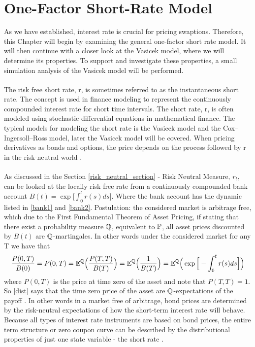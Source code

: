 \section{One-Factor Short-Rate Model}
As we have established, interest rate is crucial 
for pricing swaptions. Therefore, this Chapter will 
begin by examining the general one-factor short rate 
model. It will then continue with a closer look at the 
Vasicek model, where we will determine its properties. 
To support and investigate these properties, a small 
simulation analysis of the Vasicek model will be 
performed.
\\\\
The risk free short rate, r, is sometimes referred to as the instantaneous short rate. 
The concept is used in finance modeling to represent the continuously compounded interest rate for 
short time intervals. The short rate, r, is often modeled using stochastic differential equations in 
mathematical finance. The typical models for modeling the short rate is the Vasicek model and the Cox–Ingersoll–Ross model, 
later the Vasicek model will be covered. When pricing derivatives as bonds and options, the price depends on 
the process followed by r in the risk-neutral world \cite{Hull}.
\\\\
As discussed in the Section \ref{risk_neutral_section} - Risk Neutral Measure, $r_t$, can be looked at the locally risk free 
rate from a continuously compounded bank account $B(t)= \exp \Big[\int_{0}^{t} r(s) ds \Big]$. 
Where the bank account has the dynamic listed in \autoref{bank1} and \autoref{bank2}.
Postulation: the considered market is arbitrage free, which due to the First Fundamental Theorem of Asset Pricing, 
if stating that there exist a probability measure $\mathbb{Q}$, equivalent to $\mathbb{P}$, all asset prices discounted by $B(t)$
are $\mathbb{Q}$-martingales. In other words under the considered market for any T we have that 
\begin{align}
    \frac{P(0,T)}{B(0)} = P(0,T) = \mathbb{E}^{\mathbb{Q}} \Big( \frac{P(T,T)}{B(T)}\Big) = \mathbb{E}^{\mathbb{Q}} \Big( \frac{1}{B(T)}\Big) 
    = \mathbb{E}^{\mathbb{Q}} \Big( \exp \Big[ - \int_{0}^{t}r(s)ds \Big] \Big)
    \label{dist}
\end{align}
where $P(0,T)$ is the price at time zero of the asset and note that $P(T,T)=1$. So \autoref{dist} says that 
the time zero price of the asset are $\mathbb{Q}$-expectations  of the payoff \cite{Bermudan}.
In other words in a market free of arbitrage, bond prices are determined by the risk-neutral expectations 
of how the short-term interest rate will behave. Because all types of interest rate instruments are based
on bond prices, the entire term structure or zero coupon curve can be described by the distributional properties
of just one state variable - the short rate \cite{Bermudan}.
\newpage
